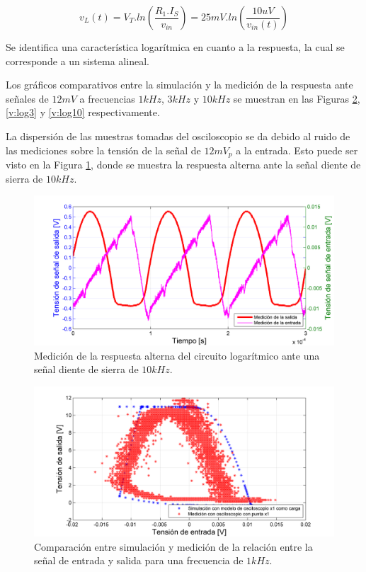 \begin{equation}
v_L(t) = V_T.ln(\frac{R_1.I_S}{v_{in}}) = 25mV.ln(\frac{10uV}{v_{in}(t)})
\end{equation}

Se identifica una característica logarítmica en cuanto a la respuesta, la cual se corresponde a un sistema alineal.

Los gráficos comparativos entre la simulación y la medición de la respuesta ante señales de $12mV$ a frecuencias $1kHz$, $3kHz$ y $10kHz$ se muestran en las Figuras \ref{v:log1}, \ref{v:log3} y \ref{v:log10} respectivamente.

La dispersión de las muestras tomadas del osciloscopio se da debido al ruido de las mediciones sobre la tensión de la señal de $12mV_p$ a la entrada. Esto puede ser visto en la Figura \ref{t:log}, donde se muestra la respuesta alterna ante la señal diente de sierra de $10kHz$.


\begin{figure}[H]
  \centering
\includegraphics[width=.8\textwidth]{gfx_22/LOG_t}
  \caption{Medición de la respuesta alterna del circuito logarítmico ante una señal diente de sierra de $10kHz$.}
  \label{t:log}
\end{figure}


\begin{figure}[H]
  \centering
\includegraphics[width=1.1\textwidth]{gfx_22/LOG_1}
  \caption{Comparación entre simulación y medición de la relación entre la señal de entrada y salida para una frecuencia de $1kHz$.}
  \label{v:log1}
\end{figure}


